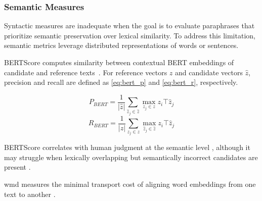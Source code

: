 \subsubsection{Semantic Measures}
Syntactic measures are inadequate when the goal is to evaluate paraphrases that prioritize semantic preservation over lexical similarity. 
To address this limitation, semantic metrics leverage distributed representations of words or sentences.

BERTScore \citep{hanna_fine_grained_2021} computes similarity between contextual BERT embeddings of candidate and reference texts~\citep{hanna_fine_grained_2021}. 
For reference vectors $z$ and candidate vectors $\hat{z}$, precision and recall are defined as \autoref{eq:bert_p} and \autoref{eq:bert_r}, respectively.

\begin{equation}
    P_{BERT} = \frac{1}{|\hat{z}|} \sum_{\hat{z}_j \in \hat{z}} \max_{z_j \in z} z_i\top \hat{z}_j
\label{eq:bert_p}
\end{equation}
\begin{equation}
    R_{BERT} = \frac{1}{|z|} \sum_{z_j \in z} \max_{\hat{z}_j \in \hat{z}} z_i\top \hat{z}_j
\label{eq:bert_r}
\end{equation}



BERTScore correlates with human judgment at the semantic level \citep{kurt_pehlivanoglu_comparative_2024}, although it may struggle when lexically overlapping but semantically incorrect candidates are present \citep{hanna_fine_grained_2021}.

\ac{wmd} measures the minimal transport cost of aligning word embeddings from one text to another \citep{gohsen_captions_2023}. 
